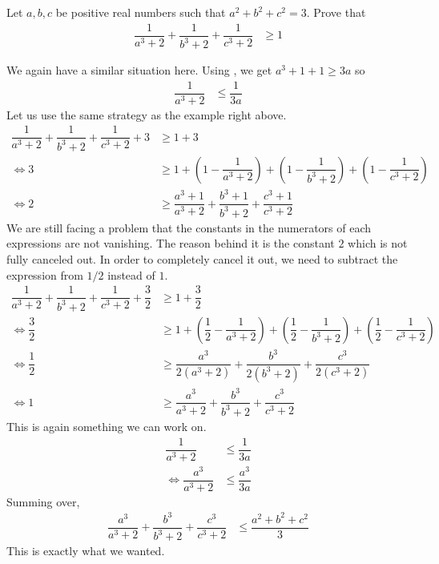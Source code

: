 \documentclass[inequalities.tex]{subfile}
\begin{document}
		\begin{problem}[PuMaC $2014$]
			Let $a,b,c$ be positive real numbers such that $a^{2}+b^{2}+c^{2}=3$. Prove that
				\begin{align*}
					\dfrac{1}{a^{3}+2}+\dfrac{1}{b^{3}+2}+\dfrac{1}{c^{3}+2}
						& \geq 1
				\end{align*}

				\begin{solution}
					We again have a similar situation here. Using , we get $a^{3}+1+1\geq 3a$ so
						\begin{align*}
							\dfrac{1}{a^{3}+2}
								& \leq \dfrac{1}{3a}
						\end{align*}
					Let us use the same strategy as the example right above.
						\begin{align*}
							\dfrac{1}{a^{3}+2}+\dfrac{1}{b^{3}+2}+\dfrac{1}{c^{3}+2}+3
								& \geq 1+3\\
							\iff 3
								& \geq 1+\left(1-\dfrac{1}{a^{3}+2}\right)+\left(1-\dfrac{1}{b^{3}+2}\right)+\left(1-\dfrac{1}{c^{3}+2}\right)\\
							\iff 2
								& \geq \dfrac{a^{3}+1}{a^{3}+2}+\dfrac{b^{3}+1}{b^{3}+2}+\dfrac{c^{3}+1}{c^{3}+2}
						\end{align*}
					We are still facing a problem that the constants in the numerators of each expressions are not vanishing. The reason behind it is the constant $2$ which is not fully canceled out. In order to completely cancel it out, we need to subtract the expression from $1/2$ instead of $1$.
						\begin{align*}
							\dfrac{1}{a^{3}+2}+\dfrac{1}{b^{3}+2}+\dfrac{1}{c^{3}+2}+\dfrac{3}{2}
								& \geq 1+\dfrac{3}{2}\\
							\iff \dfrac{3}{2}
								& \geq 1+\left(\dfrac{1}{2}-\dfrac{1}{a^{3}+2}\right)+\left(\dfrac{1}{2}-\dfrac{1}{b^{3}+2}\right)+\left(\dfrac{1}{2}-\dfrac{1}{c^{3}+2}\right)\\
							\iff \dfrac{1}{2}
								& \geq \dfrac{a^{3}}{2(a^{3}+2)}+\dfrac{b^{3}}{2(b^{3}+2)}+\dfrac{c^{3}}{2(c^{3}+2)}\\
							\iff 1
								& \geq \dfrac{a^{3}}{a^{3}+2}+\dfrac{b^{3}}{b^{3}+2}+\dfrac{c^{3}}{c^{3}+2}
						\end{align*}
					This is again something we can work on.
						\begin{align*}
							\dfrac{1}{a^{3}+2}
								& \leq \dfrac{1}{3a}\\
							\iff \dfrac{a^{3}}{a^{3}+2}
								& \leq \dfrac{a^{3}}{3a}
						\end{align*}
					Summing over,
						\begin{align*}
							\dfrac{a^{3}}{a^{3}+2}+\dfrac{b^{3}}{b^{3}+2}+\dfrac{c^{3}}{c^{3}+2}
								& \leq \dfrac{a^{2}+b^{2}+c^{2}}{3}
						\end{align*}
					This is exactly what we wanted.
				\end{solution}


\end{problem}
\end{document}
